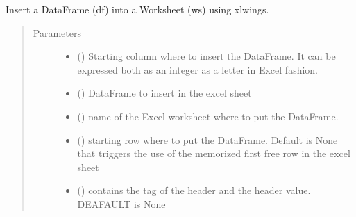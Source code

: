\documentclass[letterpaper,10pt,english]{sphinxmanual}
\begin{document}
\begin{fulllineitems}
\begin{fulllineitems}
\label{\detokenize{api/postprocessing:output.ExcelOutputSheet.insert_df}}
Insert a DataFrame (df) into a Worksheet (ws) using xlwings.
\begin{quote}\begin{description}
\item[{Parameters}] \leavevmode\begin{itemize}
\item {} 
 () \textendash{} Starting column where to insert the DataFrame. It can be expressed
both as an integer as a letter in Excel fashion.

\item {} 
 () \textendash{} DataFrame to insert in the excel sheet

\item {} 
 () \textendash{} name of the Excel worksheet where to put the DataFrame.

\item {} 
 () \textendash{} starting row where to put the DataFrame. Default is None that
triggers the use of the memorized first free row in the excel sheet

\item {} 
 (\sphinxstyleliteralemphasis{\sphinxupquote{ (}}\sphinxstyleliteralemphasis{\sphinxupquote{, }}\sphinxstyleliteralemphasis{\sphinxupquote{)}}) \textendash{} contains the tag of the header and the header value. DEAFAULT is
None


\end{itemize}
\end{description}
\end{quote}
\end{fulllineitems}
\end{fulllineitems}
\end{document}

